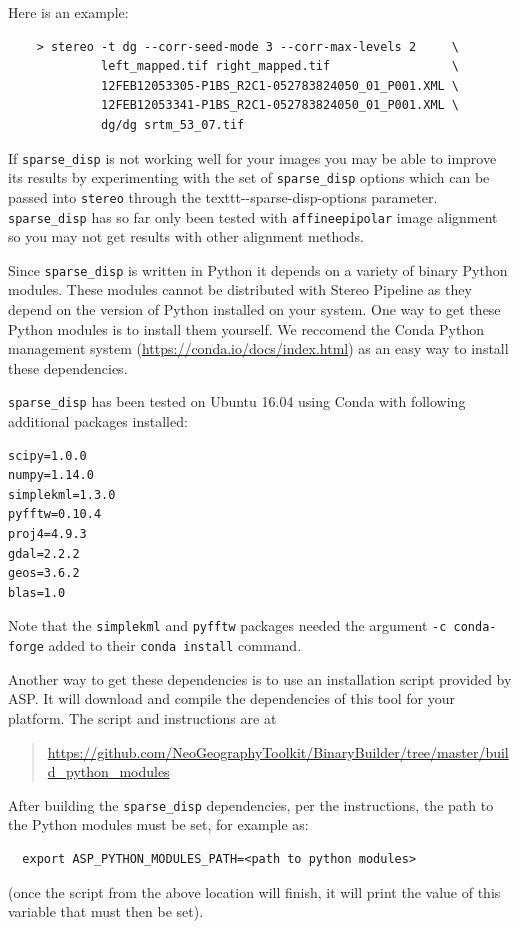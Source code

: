 Here is an example:

\begin{verbatim}
    > stereo -t dg --corr-seed-mode 3 --corr-max-levels 2     \
             left_mapped.tif right_mapped.tif                 \
             12FEB12053305-P1BS_R2C1-052783824050_01_P001.XML \
             12FEB12053341-P1BS_R2C1-052783824050_01_P001.XML \
             dg/dg srtm_53_07.tif
\end{verbatim}

If \texttt{sparse\_disp} is not working well for your images you may be
able to improve its results by experimenting with the set of \texttt{sparse\_disp}
options which can be passed into \texttt{stereo} through the 
texttt{-\/-sparse-disp-options} parameter.  \texttt{sparse\_disp}
has so far only been tested with \texttt{affineepipolar} image alignment
so you may not get results with other alignment methods.


Since \texttt{sparse\_disp} is written in Python
it depends on a variety of binary Python modules. These modules cannot
be distributed with Stereo Pipeline as they depend on the version of
Python installed on your system. One way to get these Python modules is
to install them yourself. We reccomend the Conda Python management system
(\href{https://conda.io/docs/index.html}{https://conda.io/docs/index.html})
as an easy way to install these dependencies.

\texttt{sparse\_disp} has been tested on Ubuntu 16.04 using Conda with
following additional packages installed:
\begin{verbatim}
scipy=1.0.0
numpy=1.14.0
simplekml=1.3.0
pyfftw=0.10.4
proj4=4.9.3
gdal=2.2.2
geos=3.6.2
blas=1.0
\end{verbatim}
Note that the \texttt{simplekml} and \texttt{pyfftw} packages needed the argument
\texttt{-c conda-forge} added to their \texttt{conda install} command.

Another way to get these dependencies is to use an installation script
provided by ASP.  It will download and compile the dependencies of
this tool for your platform. The script and instructions are at

\begin{quote}
\indent \href{https://github.com/NeoGeographyToolkit/BinaryBuilder/tree/master/build\_python\_modules}{https://github.com/NeoGeographyToolkit/BinaryBuilder/tree/master/build\_python\_modules}
\end{quote}

After building the \texttt{sparse\_disp} dependencies, per the instructions, the path
to the Python modules must be set, for example as:
\begin{verbatim}
  export ASP_PYTHON_MODULES_PATH=<path to python modules>
\end{verbatim}
(once the script from the above location will finish, it will print the value
of this variable that must then be set).

